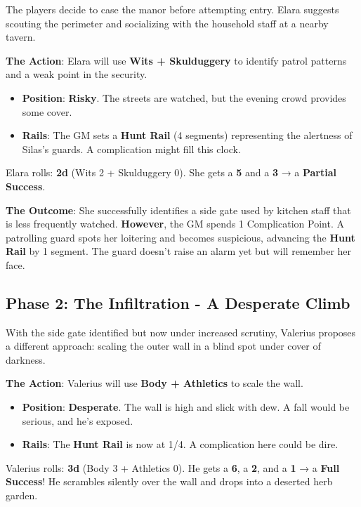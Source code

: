 The players decide to case the manor before attempting entry. Elara suggests scouting the perimeter and socializing with the household staff at a nearby tavern.

\textbf{The Action}: Elara will use \textbf{Wits + Skulduggery} to identify patrol patterns and a weak point in the security.

\begin{itemize}
    \item \textbf{Position}: \textbf{Risky}. The streets are watched, but the evening crowd provides some cover.
    \item \textbf{Rails}: The GM sets a \textbf{Hunt Rail} (4 segments) representing the alertness of Silas's guards. A complication might fill this clock.
\end{itemize}

Elara rolls: \textbf{2d} (Wits 2 + Skulduggery 0). She gets a \textbf{5} and a \textbf{3} → a \textbf{Partial Success}.

\textbf{The Outcome}: She successfully identifies a side gate used by kitchen staff that is less frequently watched. \textbf{However}, the GM spends 1 Complication Point. A patrolling guard spots her loitering and becomes suspicious, advancing the \textbf{Hunt Rail} by 1 segment. The guard doesn't raise an alarm yet but will remember her face.

\subsection*{Phase 2: The Infiltration - A Desperate Climb}

With the side gate identified but now under increased scrutiny, Valerius proposes a different approach: scaling the outer wall in a blind spot under cover of darkness.

\textbf{The Action}: Valerius will use \textbf{Body + Athletics} to scale the wall.

\begin{itemize}
    \item \textbf{Position}: \textbf{Desperate}. The wall is high and slick with dew. A fall would be serious, and he's exposed.
    \item \textbf{Rails}: The \textbf{Hunt Rail} is now at 1/4. A complication here could be dire.
\end{itemize}

Valerius rolls: \textbf{3d} (Body 3 + Athletics 0). He gets a \textbf{6}, a \textbf{2}, and a \textbf{1} → a \textbf{Full Success}! He scrambles silently over the wall and drops into a deserted herb garden.

